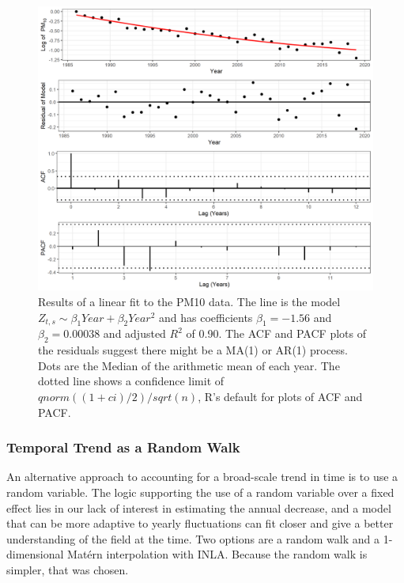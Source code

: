 \documentclass{article}
\begin{document}
\begin{figure}[ht]
    \centering
    \includegraphics[width = \textwidth]{Figures/explore_ts_exp_quad_fit.png}
    \caption{Results of a linear fit to the \ac{PM10} data.  The line is the model $Z_{t,s} \sim \beta_1 Year+ \beta_2 Year^2$ and has coefficients $\beta_1 = -1.56$ and $\beta_2 = 0.00038$ and adjusted $R^2$ of  0.90.  The \ac{ACF} and \ac{PACF} plots of the residuals suggest there might be a MA(1) or AR(1) process.  Dots are the Median of the arithmetic mean of each year. The dotted line shows a confidence limit of $qnorm((1 + ci)/2)/sqrt(n)$, R's default for plots of ACF and PACF. }
    \label{fig:explore_ts_exp_quad_fit}
\end{figure}

\subsubsection*{Temporal Trend as a Random Walk} \label{subsubsec:RWexploration}
An alternative approach to accounting for a broad-scale trend in time is to use a random variable.  The logic supporting the use of a random variable over a fixed effect lies in our lack of interest in estimating the annual decrease, and a model that can be more adaptive to yearly fluctuations can fit closer and give a better understanding of the field at the time.  Two options are a random walk and a 1-dimensional Mat\'{e}rn interpolation with \ac{INLA}.  Because the random walk is simpler, that was chosen.
\end{document}
